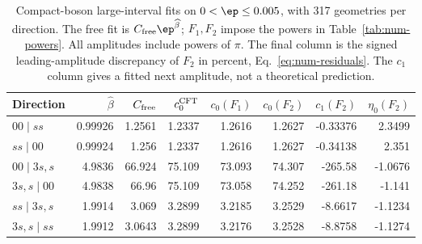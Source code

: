 \begin{table}[htbp]\centering\footnotesize
\setlength{\tabcolsep}{3.5pt}
\begin{tabular}{lrrrrrrr}\toprule
Direction & $\widehat\beta$ & $C_{\rm free}$ & $c_0^{\rm CFT}$ & $c_0(F_1)$ & $c_0(F_2)$ & $c_1(F_2)$ & $\eta_0(F_2)$\\\midrule
$00\mid ss$ & 0.99926 & 1.2561 & 1.2337 & 1.2616 & 1.2627 & -0.33376 & 2.3499\\
$ss\mid 00$ & 0.99924 & 1.256 & 1.2337 & 1.2616 & 1.2627 & -0.34138 & 2.351\\
$00\mid 3s,s$ & 4.9836 & 66.924 & 75.109 & 73.093 & 74.307 & -265.58 & -1.0676\\
$3s,s\mid 00$ & 4.9838 & 66.96 & 75.109 & 73.058 & 74.252 & -261.18 & -1.141\\
$ss\mid 3s,s$ & 1.9914 & 3.069 & 3.2899 & 3.2185 & 3.2529 & -8.6617 & -1.1234\\
$3s,s\mid ss$ & 1.9912 & 3.0643 & 3.2899 & 3.2176 & 3.2528 & -8.8758 & -1.1274\\
\bottomrule\end{tabular}
\caption{Compact-boson large-interval fits on $0<\ep\leq0.005$, with 317 geometries per direction. The free fit is $C_{\rm free}\ep^{\widehat\beta}$; $F_1,F_2$ impose the powers in Table~\ref{tab:num-powers}. All amplitudes include powers of $\pi$. The final column is the signed leading-amplitude discrepancy of $F_2$ in percent, Eq.~\eqref{eq:num-residuals}. The $c_1$ column gives a fitted next amplitude, not a theoretical prediction.}
\label{tab:num-boson-large}
\end{table}
